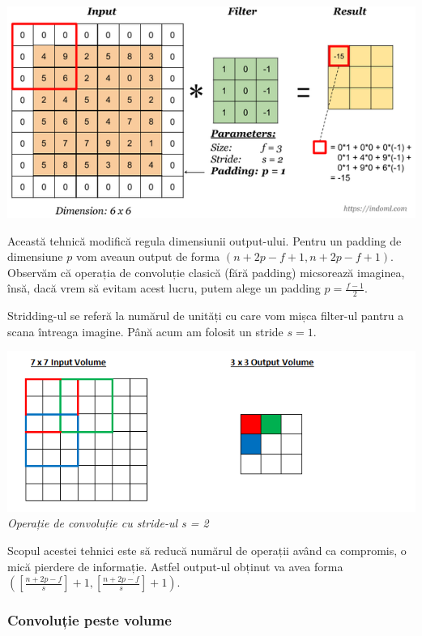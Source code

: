 \begin{center}
\includegraphics[scale=0.7]{padding}
\end{center}

Această tehnică modifică regula dimensiunii output-ului. Pentru un padding de dimensiune $p$ vom aveaun output de forma $(n+2p-f+1, n+2p-f+1)$. Observăm că operația de convoluție clasică (fără padding) micsorează imaginea, însă, dacă vrem să evitam acest lucru, putem alege un padding $\displaystyle{p=\frac{f-1}{2}}$.

Stridding-ul se referă la numărul de unități cu care vom mișca filter-ul pantru a scana întreaga imagine. Până acum am folosit un stride $s=1$.

\begin{center}
\includegraphics[scale=1]{stride} \\
\textit{Operație de convoluție cu stride-ul s = 2}
\end{center}

Scopul acestei tehnici este să reducă numărul de operații având ca compromis, o mică pierdere de informație. Astfel output-ul obținut va avea forma $\displaystyle{\left(\displaystyle{\left[\frac{n+2p-f}{s}\right]}+1, \displaystyle{\left[\frac{n+2p-f}{s}\right]}+1\right)}$.

\subsubsection{Convoluție peste volume}

